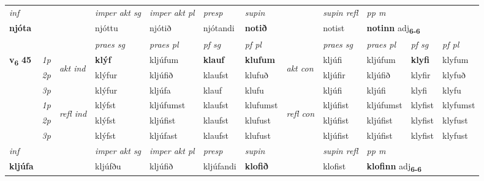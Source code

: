 \begin{longtable}[l]{X>{\footnotesize\itshape}llXXXXlXXXX}
   {\textit{inf}} & &  & \textit{imper akt sg} & \textit{imper akt pl}   & \textit{presp} & \textit{supin} && \textit{supin refl} & \textit{pp m} \\*
  {\textbf{njóta}} & && njóttu  & njótið   & njótandi &  \textbf{notið} && notist & \multicolumn{2}{l}{\textbf{notinn} adj\textbf{\textsubscript{6-6}}} \\*

\midrule

 & &   & \textit{praes sg}  & \textit{praes pl}    & \textit{ pf sg} & \textit{pf pl} & & \textit{praes sg}  & \textit{praes pl}    & \textit{pf sg} & \textit{pf pl }  \\ \cmidrule{4-7} \cmidrule{9-12}
 \multirow{2}{*}{{{\textbf{v{\textsubscript{6}}} \Large{\textbf{45}}}}}  & 1p & \multirow{3}{*}{\begin{turn}{90}\textit{akt ind}\end{turn}} & \textbf{klýf} & kljúfum & \textbf{klauf} & \textbf{klufum} & \multirow{3}{*}{\begin{turn}{90}\textit{akt con}\end{turn}} &kljúfi & kljúfum & \textbf{klyfi} & klyfum\\*
 & 2p &  &  klýfur  & kljúfið & klaufst & klufuð & & kljúfir & kljúfið & klyfir & klyfuð \\*
 & 3p &  & klýfur & kljúfa & klauf & klufu & & kljúfi & kljúfi& klyfi & klyfu \\*
\cmidrule{4-7} \cmidrule{9-12}
 & 1p & \multirow{3}{*}{\begin{turn}{90}\textit{refl ind}\end{turn}}  & klýfst & kljúfumst & klaufst & klufumst & \multirow{3}{*}{\begin{turn}{90}\textit{refl con}\end{turn}}  &kljúfist & kljúfumst & klyfist & klyfumst \\*
 & 2p &  & klýfst & kljúfist & klaufst & klufust & &kljúfist & kljúfist & klyfist & klyfust \\*
 & 3p  & & klýfst & kljúfast & klaufst & klufust & & kljúfist & kljúfist& klyfist & klyfust \\*
\cmidrule{4-7} \cmidrule{9-12}

   {\textit{inf}} & &  & \textit{imper akt sg} & \textit{imper akt pl}   & \textit{presp} & \textit{supin} && \textit{supin refl} & \textit{pp m} \\*
  {\textbf{kljúfa}} & && kljúfðu  & kljúfið   & kljúfandi &  \textbf{klofið} && klofist & \multicolumn{2}{l}{\textbf{klofinn} adj\textbf{\textsubscript{6-6}}} \\*


\end{longtable}
